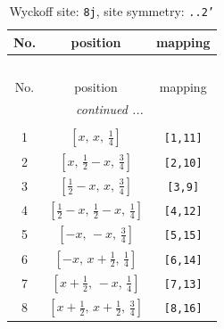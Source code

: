 \documentclass[fleqn,8pt]{jsarticle}
\begin{document}
\begin{longtable}{ccc}
\caption{Wyckoff site: {\tt 8j}, site symmetry: {\tt ..2'}}
 \\
 \hline \hline
No. & position & mapping \\ \hline \endfirsthead

\multicolumn{2}{l}{\tablename\ \thetable{}} \\
 \hline \hline
No. & position & mapping \\ \hline \endhead

 \hline \hline
\multicolumn{2}{r}{\footnotesize\it continued ...} \\ \endfoot

 \hline \hline
\multicolumn{2}{r}{} \\ \endlastfoot

1 & $\left[ x,\, x,\, \frac{1}{4} \right]$ & {\tt [1,11]} \\ \hline
2 & $\left[ x,\, \frac{1}{2} - x,\, \frac{3}{4} \right]$ & {\tt [2,10]} \\ \hline
3 & $\left[ \frac{1}{2} - x,\, x,\, \frac{3}{4} \right]$ & {\tt [3,9]} \\ \hline
4 & $\left[ \frac{1}{2} - x,\, \frac{1}{2} - x,\, \frac{1}{4} \right]$ & {\tt [4,12]} \\ \hline
5 & $\left[ - x,\, - x,\, \frac{3}{4} \right]$ & {\tt [5,15]} \\ \hline
6 & $\left[ - x,\, x + \frac{1}{2},\, \frac{1}{4} \right]$ & {\tt [6,14]} \\ \hline
7 & $\left[ x + \frac{1}{2},\, - x,\, \frac{1}{4} \right]$ & {\tt [7,13]} \\ \hline
8 & $\left[ x + \frac{1}{2},\, x + \frac{1}{2},\, \frac{3}{4} \right]$ & {\tt [8,16]} \\
\end{longtable}
\renewcommand{\arraystretch}{1.2}
\end{document}
